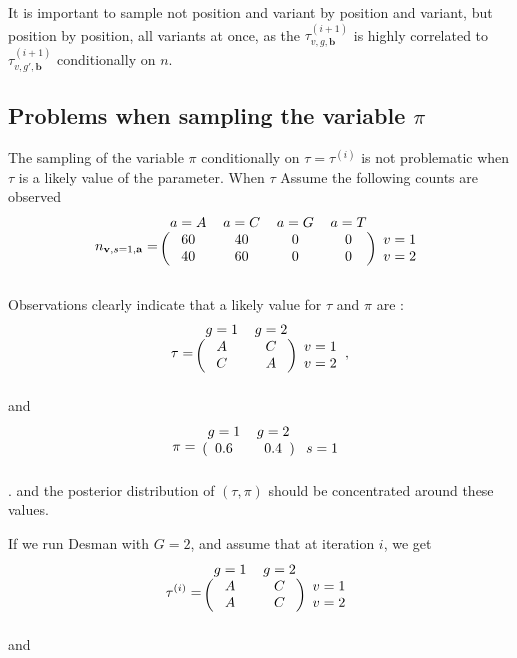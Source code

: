\documentclass{article}
\newcommand\indexvec[1]{\mathbf{#1}}
\begin{document}
It is important to sample not position and variant by position and variant, but position by position, all variants at once, as the $\tau^{(i+1)}_{v,g,\indexvec{b}}$ is highly correlated to $\tau^{(i+1)}_{v,g',\indexvec{b}}$ conditionally on $n$.

\subsection{Problems when sampling the variable $\pi$}
The sampling of the variable $\pi$ conditionally on $\tau=\tau^{(i)}$ is not problematic when $\tau$ is a likely value of the parameter.
When $\tau$
Assume the following counts are observed 
$$n_{\indexvec{v},s=1,\indexvec{a}}=\begin{blockarray}{ccccc}
    a=A&a=C&a=G&a=T&\\
    \begin{block}{(cccc)c}
    60&40&0&0&v=1\\
    40&60&0&0&v=2\\
    \end{block}
\end{blockarray}$$

Observations clearly indicate that a likely value for $\tau$ and $\pi$ are :
$$\tau=\begin{blockarray}{ccc}
    g=1&g=2&\\
    \begin{block}{(cc)c}
    A&C&v=1\\
    C&A&v=2\\
    \end{block}
\end{blockarray},$$ 
and $$\pi=\begin{blockarray}{ccc}
    g=1&g=2&\\
    \begin{block}{(cc)c}
    0.6&0.4&s=1\\
    \end{block}
\end{blockarray}$$.
and the posterior distribution of $(\tau,\pi)$ should be concentrated around these values.

If we run Desman with $G=2$, and assume that at iteration $i$, we get 
$$\tau^{(i)}=\begin{blockarray}{ccc}
    g=1&g=2&\\
    \begin{block}{(cc)c}
    A&C&v=1\\
    A&C&v=2\\
    \end{block}
\end{blockarray}$$ and 
\end{document}
